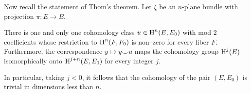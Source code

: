 \documentclass[../main]{subfiles}
\begin{document}
Now recall the statement of Thom's theorem. Let $\xi$ be an $n$-plane bundle with projection $\pi : E \longrightarrow B$. 
\begin{theorem}
\label{thm:10.2}
There is one and only one cohomology class $u \in \operatorname{H}^n(E, E_0)$ with mod $2$ coefficients whose restriction to $\operatorname{H}^n(F, F_0)$ is non--zero for every fiber $F$. Furthermore, the correspondence $y \mapsto y \smile u$ maps the cohomology group $\operatorname{H}^j(E)$ isomorphically onto $\operatorname{H}^{j + n}(E, E_0)$ for every integer $j$. 
\end{theorem}

In particular, taking $j < 0$, it follows that the cohomology of the pair $(E, E_0)$ is trivial in dimensions less than $n$. 
\end{document}
